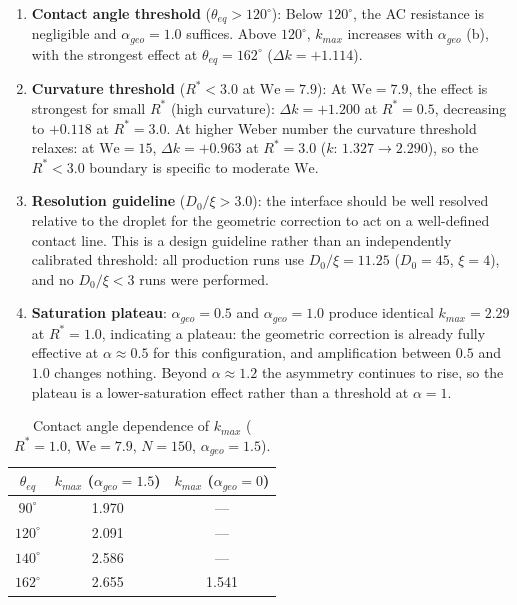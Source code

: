 \begin{enumerate}
    \item \textbf{Contact angle threshold} ($\theta_{eq} > 120^\circ$): Below $120^\circ$, the AC resistance is negligible and $\alpha_{geo} = 1.0$ suffices. Above $120^\circ$, $k_{max}$ increases with $\alpha_{geo}$ (b), with the strongest effect at $\theta_{eq}=162^\circ$ ($\Delta k = +1.114$).
    \item \textbf{Curvature threshold} ($R^* < 3.0$ at $\mathrm{We}=7.9$): At $\mathrm{We}=7.9$, the effect is strongest for small $R^*$ (high curvature): $\Delta k = +1.200$ at $R^*=0.5$, decreasing to $+0.118$ at $R^*=3.0$. At higher Weber number the curvature threshold relaxes: at $\mathrm{We}=15$, $\Delta k = +0.963$ at $R^*=3.0$ ($k$: $1.327 \to 2.290$), so the $R^*<3.0$ boundary is specific to moderate $\mathrm{We}$.
    \item \textbf{Resolution guideline} ($D_0/\xi > 3.0$): the interface should be well resolved relative to the droplet for the geometric correction to act on a well-defined contact line. This is a design guideline rather than an independently calibrated threshold: all production runs use $D_0/\xi = 11.25$ ($D_0=45$, $\xi=4$), and no $D_0/\xi < 3$ runs were performed.
    \item \textbf{Saturation plateau}: $\alpha_{geo}=0.5$ and $\alpha_{geo}=1.0$ produce identical $k_{max}=2.29$ at $R^*=1.0$, indicating a plateau: the geometric correction is already fully effective at $\alpha \approx 0.5$ for this configuration, and amplification between $0.5$ and $1.0$ changes nothing. Beyond $\alpha \approx 1.2$ the asymmetry continues to rise, so the plateau is a lower-saturation effect rather than a threshold at $\alpha=1$.
\end{enumerate}

\begin{table}[htbp]
\centering
\caption{Contact angle dependence of $k_{max}$ ($R^*=1.0$, $\mathrm{We}=7.9$, $N=150$, $\alpha_{geo}=1.5$).}
\label{tab:theta_amp}
\begin{tabular}{c|c|c}
\hline
$\theta_{eq}$ & $k_{max}$ ($\alpha_{geo}=1.5$) & $k_{max}$ ($\alpha_{geo}=0$) \\
\hline
$90^\circ$  & 1.970 & --- \\
$120^\circ$ & 2.091 & --- \\
$140^\circ$ & 2.586 & --- \\
$162^\circ$ & 2.655 & 1.541 \\
\hline
\end{tabular}
\end{table}

